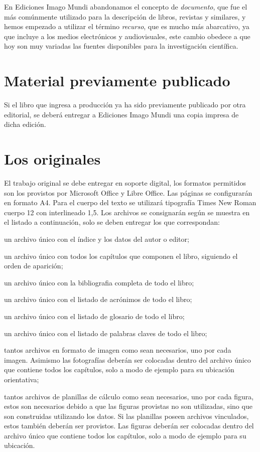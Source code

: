 \documentclass{book}
\begin{document}
{{{{En Ediciones Imago Mundi abandonamos el concepto de \emph{documento}, que fue el más comúnmente utilizado para la descripción de libros, revistas y similares, y hemos empezado a utilizar el término \emph{recurso}, que es mucho más abarcativo, ya que incluye a los medios electrónicos y audiovisuales, este cambio obedece a que hoy son muy variadas las fuentes disponibles para la investigación científica.

\section{Material previamente publicado}

Si el libro que ingresa a producción ya ha sido previamente publicado por otra editorial, se deberá entregar a Ediciones Imago Mundi una copia impresa de dicha edición.

\section{Los originales}

El trabajo original se debe entregar en soporte digital, los formatos permitidos son los provistos por Microsoft Office y Libre Office. Las páginas se configurarán en formato A4. Para el cuerpo del texto se utilizará tipografía Times New Roman cuerpo 12 con interlineado 1,5. Los archivos se consignarán según se muestra en el listado a continuación, solo se deben entregar los que correspondan:

\begin{compactenum}
\item un archivo único con el índice y los datos del autor o editor;
\item un archivo único con todos los capítulos que componen el libro, siguiendo el orden de aparición;
\item un archivo único con la bibliografia completa de todo el libro;
\item un archivo único con el listado de acrónimos de todo el libro;
\item un archivo único con el listado de glosario de todo el libro;
\item un archivo único con el listado de palabras claves de todo el libro;
\item tantos archivos en formato de imagen como sean necesarios, uno por cada imagen. Asimismo las fotografías deberán ser colocadas dentro del archivo único que contiene todos los capítulos, solo a modo de ejemplo para su ubicación orientativa;
\item tantos archivos de planillas de cálculo como sean necesarios, uno por cada figura, estos son necesarios debido a que las figuras provistas no son utilizadas, sino que son construidas utilizando los datos. Si las planillas poseen archivos vinculados, estos también deberán ser provistos. Las figuras deberán ser colocadas dentro del archivo único que contiene todos los capítulos, solo a modo de ejemplo para su ubicación.
\end{compactenum}

}}}}
\end{document}

